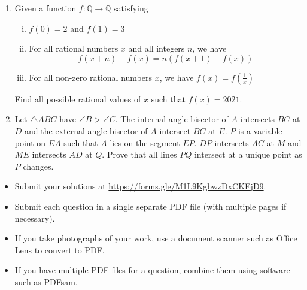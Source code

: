 \documentclass{article}
\begin{document}
\begin{enumerate}[1.]
\item %
Given a function $f: \mathbb{Q} \rightarrow \mathbb{Q}$ satisfying
\begin{enumerate}[i)]
  \item $f(0) = 2$ and $f(1) = 3$
  \item For all rational numbers $x$ and all integers $n$, we have 
  $$f(x + n) - f(x) = n(f(x + 1) - f(x)) $$
  \item For all non-zero rational numbers $x$, we have $f(x) = f(\frac{1}{x})$
\end{enumerate}
Find all possible rational values of $x$ such that $f(x) = 2021$.


\item %
Let $\triangle ABC$ have $ \angle B > \angle C$.
The internal angle bisector of $A$ intersects $BC$ at $D$ and the external angle bisector of $A$ intersect $BC$ at $E$.
$P$ is a variable point on $EA$ such that $A$ lies on the segment $EP$.
$DP$ intersects $AC$ at $M$ and $ME$ intersects $AD$ at $Q$.
Prove that all lines $PQ$ intersect at a unique point as $P$ changes.

\end{enumerate}


\vfill
\begin{itemize}
	\item Submit your solutions at \url{https://forms.gle/M1L9KgbwzDxCKEjD9}.
	\item Submit each question in a single separate PDF file (with multiple pages if necessary).
	\item If you take photographs of your work, use a document scanner such as Office Lens to convert to PDF.
	\item If you have multiple PDF files for a question, combine them using software such as PDFsam.
\end{itemize}
\end{document}
